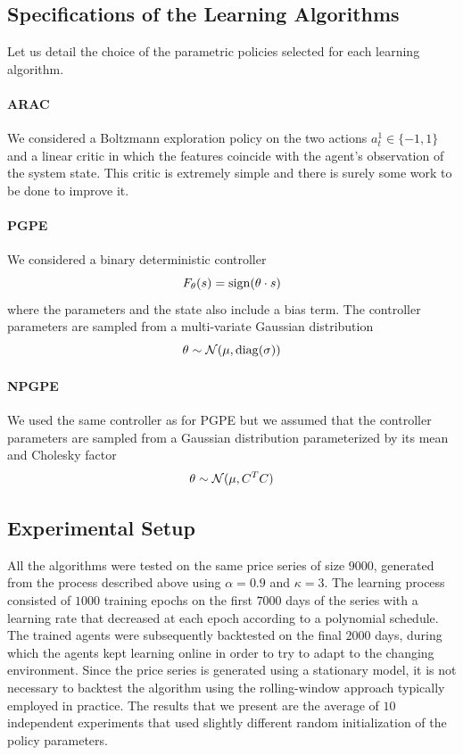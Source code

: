 \subsection{Specifications of the Learning Algorithms}
Let us detail the choice of the parametric policies selected for each learning algorithm.  

\paragraph{ARAC} 
We considered a Boltzmann exploration policy on the two actions $a_t^1 \in \{-1, 1\}$ and a linear critic in which the features coincide with the agent's observation of the system state. This critic is extremely simple and there is surely some work to be done to improve it. 

\paragraph{PGPE}
We considered a binary deterministic controller 
\begin{equation*}
	F_\theta(s) = \operatorname{sign}(\theta \cdot s)
\end{equation*}
where the parameters and the state also include a bias term. The controller parameters are sampled from a multi-variate Gaussian distribution
\begin{equation*}
	\theta \sim \mathcal{N}(\mu, \operatorname{diag}(\sigma))
\end{equation*}  

\paragraph{NPGPE}
We used the same controller as for \gls{PGPE} but we assumed that the controller parameters are sampled from a Gaussian distribution parameterized by its mean and Cholesky factor
\begin{equation*}
	\theta \sim \mathcal{N}(\mu, C^T C)
\end{equation*}  


\subsection{Experimental Setup}   
All the algorithms were tested on the same price series of size $9000$, generated from the process described above using $\alpha = 0.9$ and $\kappa = 3$. The learning process consisted of $1000$ training epochs on the first $7000$ days of the series with a learning rate that decreased at each epoch according to a polynomial schedule. The trained agents were subsequently backtested on the final $2000$ days, during which the agents kept learning online in order to try to adapt to the changing environment. Since the price series is generated using a stationary model, it is not necessary to backtest the algorithm using the rolling-window approach typically employed in practice. The results that we present are the average of $10$ independent experiments that used slightly different random initialization of the policy parameters.   


